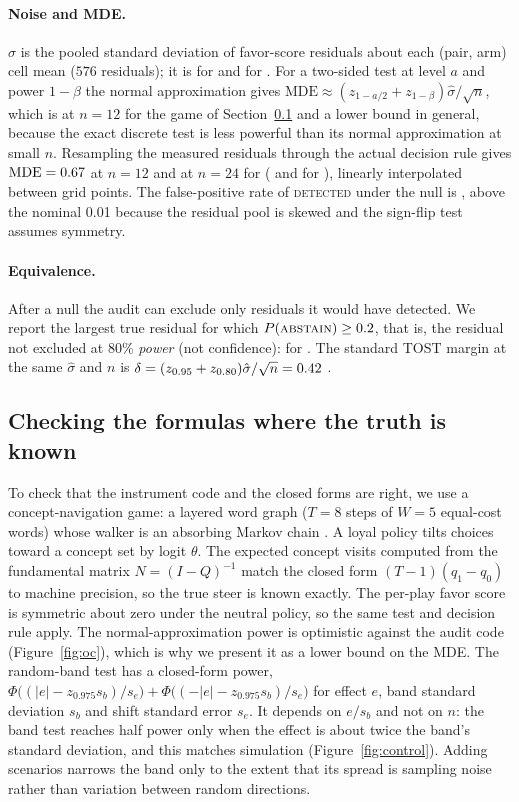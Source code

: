 \documentclass{article}
\begin{document}
\paragraph{Noise and MDE.}
$\hat\sigma$ is the pooled standard deviation of favor-score residuals about each (pair, arm) cell
mean ($576$ residuals); it is \sigmaHatA{} for \ModelA{} and \sigmaHatB{} for \ModelB{}.
For a two-sided test at level $a$ and power $1-\beta$ the normal approximation gives
$\mathrm{MDE}\approx(z_{1-a/2}+z_{1-\beta})\hat\sigma/\sqrt n$, which is \mdeClosedTwelve{} at $n{=}12$ for the
game of Section~\ref{sec:analytic} and a lower bound in general, because the exact discrete test is less
powerful than its normal approximation at small $n$. Resampling the measured residuals through the
actual decision rule gives $\mathrm{MDE}=0.67$ at $n{=}12$ and \mdeTwentyFourA{} at $n{=}24$ for
\ModelA{} (\mdeTwelveB{} and \mdeTwentyFourB{} for \ModelB{}), linearly interpolated between grid points.
The false-positive rate of \textsc{detected} under the null is \fprNullA{}, above the nominal
0.01 because the residual pool is skewed and the sign-flip test assumes symmetry.

\paragraph{Equivalence.}
After a null the audit can exclude only residuals it would have detected. We report the largest
true residual for which $P(\textsc{abstain})\ge0.2$, that is, the residual not excluded at 80\%
\emph{power} (not confidence): \eqboundA{} for \ModelA{}. The standard TOST margin at the same
$\hat\sigma$ and $n$ is $\delta=(z_{0.95}+z_{0.80})\hat\sigma/\sqrt n=0.42$
\citep{schuirmann1987,lakens2018}.

\subsection{Checking the formulas where the truth is known}
\label{sec:analytic}
To check that the instrument code and the closed forms are right, we use a concept-navigation game:
a layered word graph ($T{=}8$ steps of $W{=}5$ equal-cost words) whose walker is an absorbing Markov
chain \citep{kemeny1976}. A loyal policy tilts choices toward a concept set by logit $\theta$. The
expected concept visits computed from the fundamental matrix $N=(I-Q)^{-1}$ match the closed form
$(T{-}1)(q_1{-}q_0)$ to machine precision, so the true steer is known exactly. The per-play favor
score is symmetric about zero under the neutral policy, so the same test and decision rule apply.
The normal-approximation power is optimistic against the audit code (Figure~\ref{fig:oc}), which
is why we present it as a lower bound on the MDE. The random-band test has a closed-form power,
$\Phi\!\big((|e|-z_{0.975}s_b)/s_e\big)+\Phi\!\big((-|e|-z_{0.975}s_b)/s_e\big)$ for effect $e$, band standard
deviation $s_b$ and shift standard error $s_e$. It depends on $e/s_b$ and not on $n$: the band test
reaches half power only when the effect is about twice the band's standard deviation, and this
matches simulation (Figure~\ref{fig:control}). Adding scenarios narrows the band only to the extent that its spread is sampling noise rather than variation between random directions.
\end{document}
